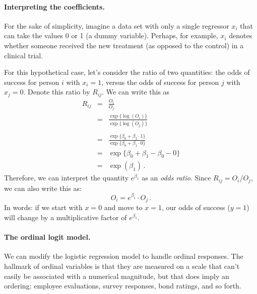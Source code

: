 \documentclass[11pt]{article}
\newcommand{\1}[1]{\mathbf{1}_{\{ {#1} \}}}
\begin{document}
\paragraph{Interpreting the coefficients.}  For the sake of simplicity, imagine a data set with only a single regressor $x_i$ that can take the values 0 or 1 (a dummy variable).  Perhaps, for example, $x_i$ denotes whether someone received the new treatment (as opposed to the control) in a clinical trial.

For this hypothetical case, let's consider the ratio of two quantities: the odds of success for person $i$ with $x_i = 1$, versus the odds of success for person $j$ with $x_j = 0$.  Denote this ratio by $R_{ij}$.  We can write this as
\begin{eqnarray*}
R_{ij} &=& \frac{O_i}{O_j} \\
&=& \frac{ \exp\{ \log(O_i) \} } { \exp\{ \log(O_j) \} } \\
\\
&=&  \frac{ \exp\{ \beta_0 + \beta_1 \cdot 1 \} } { \exp\{ \beta_0 + \beta_1 \cdot 0 \} } \\
&=& \exp\{ \beta_0 + \beta_1 - \beta_0 - 0 \} \\
&=& \exp (\beta_1) \, .
\end{eqnarray*}
Therefore, we can interpret the quantity $e^{\beta_1}$ as an \textit{odds ratio}.  Since $R_{ij} = O_i / O_j$, we can also write this as:
$$
O_i = e^{\beta_1} \cdot O_j \, .
$$
In words: if we start with $x = 0$ and move to $x=1$, our odds of success ($y=1$) will change by a multiplicative factor of $e^{\beta_1}$.


\paragraph{The ordinal logit model.}

We can modify the logistic regression model to handle ordinal responses.  The hallmark of ordinal variables is that they are measured on a scale that can't easily be associated with a numerical magnitude, but that does imply an ordering: employee evaluations, survey responses, bond ratings, and so forth.
\end{document}
